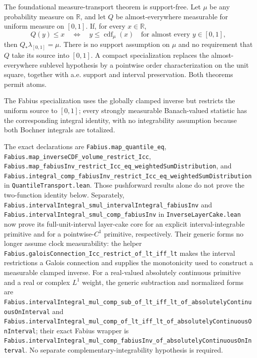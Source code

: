 \documentclass[11pt,oneside]{article}
\theoremstyle{definition}
\theoremstyle{remark}
\newcommand{\R}{\mathbb R}
\newcommand{\1}{\mathbf 1}
\begin{document}
\begin{statusbox}
The foundational measure-transport theorem is support-free.  Let \(\mu\) be any
probability measure on \(\R\), and let \(Q\) be almost-everywhere measurable for uniform
measure on \([0,1]\).  If, for every \(x\in\R\),
\[
 Q(y)\le x\quad\Longleftrightarrow\quad y\le\operatorname{cdf}_{\mu}(x)
 \quad\text{for almost every \(y\in[0,1]\)},
\]
then \(Q_*\lambda_{[0,1]}=\mu\).  There is no support assumption on \(\mu\) and no
requirement that \(Q\) take its source into \([0,1]\).  A compact specialization replaces
the almost-everywhere sublevel hypothesis by a pointwise order characterization on the
unit square, together with a.e. support and interval preservation.  Both theorems permit
atoms.

The Fabius specialization uses the globally clamped inverse but restricts the uniform
source to \([0,1]\); every strongly measurable Banach-valued statistic has the
corresponding integral identity,
with no integrability assumption because both Bochner integrals are totalized.

The exact declarations are
\nolinkurl{Fabius.map_quantile_eq},
\nolinkurl{Fabius.map_inverseCDF_volume_restrict_Icc},
\nolinkurl{Fabius.map_fabiusInv_restrict_Icc_eq_weightedSumDistribution}, and
\nolinkurl{Fabius.integral_comp_fabiusInv_restrict_Icc_eq_weightedSumDistribution}
in \texttt{QuantileTransport.lean}.  Those pushforward results alone do not prove the
two-function identity below.  Separately,
\nolinkurl{Fabius.intervalIntegral_smul_intervalIntegral_fabiusInv} and
\nolinkurl{Fabius.intervalIntegral_smul_comp_fabiusInv} in
\texttt{InverseLayerCake.lean} now prove its full-unit-interval layer-cake core for an
explicit interval-integrable primitive and for a pointwise-\(C^1\) primitive,
respectively.  Their generic forms no longer assume clock measurability: the helper
\nolinkurl{Fabius.galoisConnection_Icc_restrict_of_lt_iff_lt} makes the interval
restrictions a Galois connection and supplies the monotonicity used to construct a
measurable clamped inverse.  For a real-valued absolutely continuous primitive and a real
or complex \(L^1\) weight, the generic subtraction and normalized forms are
\nolinkurl{Fabius.intervalIntegral_mul_comp_sub_of_lt_iff_lt_of_absolutelyContinuousOnInterval}
and
\nolinkurl{Fabius.intervalIntegral_mul_comp_of_lt_iff_lt_of_absolutelyContinuousOnInterval};
their exact Fabius wrapper is
\nolinkurl{Fabius.intervalIntegral_mul_comp_fabiusInv_of_absolutelyContinuousOnInterval}.
No separate complementary-integrability hypothesis is required.


\end{statusbox}
\end{document}
